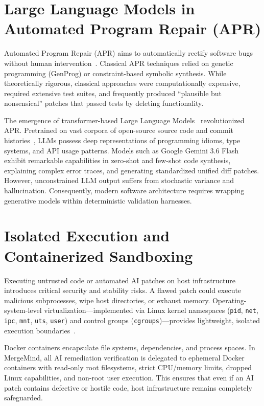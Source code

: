 \section{Large Language Models in Automated Program Repair (APR)}
\label{sec:lit-apr-llm}

Automated Program Repair (APR) aims to automatically rectify software bugs without human intervention~\cite{legoues2019automated}. Classical APR techniques relied on genetic programming (GenProg) or constraint-based symbolic synthesis. While theoretically rigorous, classical approaches were computationally expensive, required extensive test suites, and frequently produced ``plausible but nonsensical'' patches that passed tests by deleting functionality.

The emergence of transformer-based Large Language Models~\cite{vaswani2017attention} revolutionized APR. Pretrained on vast corpora of open-source source code and commit histories~\cite{chen2021evaluating}, LLMs possess deep representations of programming idioms, type systems, and API usage patterns. Models such as Google Gemini 3.6 Flash~\cite{deepmind2023gemini} exhibit remarkable capabilities in zero-shot and few-shot code synthesis, explaining complex error traces, and generating standardized unified diff patches. However, unconstrained LLM output suffers from stochastic variance and hallucination. Consequently, modern software architecture requires wrapping generative models within deterministic validation harnesses.

\section{Isolated Execution and Containerized Sandboxing}
\label{sec:lit-sandbox}

Executing untrusted code or automated AI patches on host infrastructure introduces critical security and stability risks. A flawed patch could execute malicious subprocesses, wipe host directories, or exhaust memory. Operating-system-level virtualization---implemented via Linux kernel namespaces (\texttt{pid}, \texttt{net}, \texttt{ipc}, \texttt{mnt}, \texttt{uts}, \texttt{user}) and control groups (\texttt{cgroups})---provides lightweight, isolated execution boundaries~\cite{merkel2014docker}.

Docker containers encapsulate file systems, dependencies, and process spaces. In MergeMind, all AI remediation verification is delegated to ephemeral Docker containers with read-only root filesystems, strict CPU/memory limits, dropped Linux capabilities, and non-root user execution. This ensures that even if an AI patch contains defective or hostile code, host infrastructure remains completely safeguarded.

